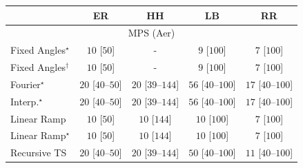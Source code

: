 \begin{tabular}{l|cccc|}
\toprule
            & ER & HH & LB & RR \\
\midrule
\multicolumn{5}{c}{\rule{0pt}{8pt}MPS (Aer)} \\
\midrule
Fixed Angles$^\star$ & {\cellcolor[HTML]{F7FCF5}} \color[HTML]{000000} $10$ [$50$] & {\cellcolor[HTML]{000000}} \color[HTML]{F1F1F1} {\cellcolor{white}} \color{black} - & {\cellcolor[HTML]{F7FCF5}} \color[HTML]{000000} $9$ [$100$] & {\cellcolor[HTML]{F7FCF5}} \color[HTML]{000000} $7$ [$100$] \\
Fixed Angles$^\dagger$ & {\cellcolor[HTML]{F7FCF5}} \color[HTML]{000000} $10$ [$50$] & {\cellcolor[HTML]{000000}} \color[HTML]{F1F1F1} {\cellcolor{white}} \color{black} - & {\cellcolor[HTML]{F7FCF5}} \color[HTML]{000000} $9$ [$100$] & {\cellcolor[HTML]{F7FCF5}} \color[HTML]{000000} $7$ [$100$] \\
Fourier$^\star$ & {\cellcolor[HTML]{F5FBF2}} \color[HTML]{000000} $20$ [$40$--$50$] & {\cellcolor[HTML]{F5FBF2}} \color[HTML]{000000} $20$ [$39$--$144$] & {\cellcolor[HTML]{EFF9EB}} \color[HTML]{000000} $56$ [$40$--$100$] & {\cellcolor[HTML]{F5FBF3}} \color[HTML]{000000} $17$ [$40$--$100$] \\
Interp.$^\star$ & {\cellcolor[HTML]{F5FBF2}} \color[HTML]{000000} $20$ [$40$--$50$] & {\cellcolor[HTML]{F5FBF2}} \color[HTML]{000000} $20$ [$39$--$144$] & {\cellcolor[HTML]{EFF9EB}} \color[HTML]{000000} $56$ [$40$--$100$] & {\cellcolor[HTML]{F5FBF3}} \color[HTML]{000000} $17$ [$40$--$100$] \\
Linear Ramp & {\cellcolor[HTML]{F7FCF5}} \color[HTML]{000000} $10$ [$50$] & {\cellcolor[HTML]{F7FCF5}} \color[HTML]{000000} $10$ [$144$] & {\cellcolor[HTML]{F7FCF5}} \color[HTML]{000000} $10$ [$100$] & {\cellcolor[HTML]{F7FCF5}} \color[HTML]{000000} $7$ [$100$] \\
Linear Ramp$^\star$ & {\cellcolor[HTML]{F7FCF5}} \color[HTML]{000000} $10$ [$50$] & {\cellcolor[HTML]{F7FCF5}} \color[HTML]{000000} $10$ [$144$] & {\cellcolor[HTML]{F7FCF5}} \color[HTML]{000000} $10$ [$100$] & {\cellcolor[HTML]{F7FCF5}} \color[HTML]{000000} $7$ [$100$] \\
Recursive TS & {\cellcolor[HTML]{F5FBF2}} \color[HTML]{000000} $20$ [$40$--$50$] & {\cellcolor[HTML]{F5FBF2}} \color[HTML]{000000} $20$ [$39$--$144$] & {\cellcolor[HTML]{F0F9EC}} \color[HTML]{000000} $50$ [$40$--$100$] & {\cellcolor[HTML]{F6FCF4}} \color[HTML]{000000} $11$ [$40$--$100$] \\

\end{tabular}
